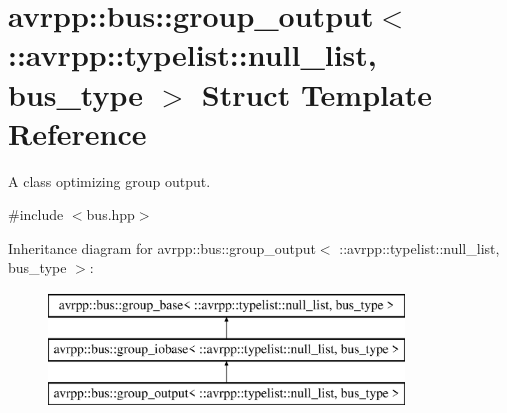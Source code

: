 \hypertarget{structavrpp_1_1bus_1_1group__output_3_01_1_1avrpp_1_1typelist_1_1null__list_00_01bus__type_01_4}{
\section{avrpp::bus::group\_\-output$<$ ::avrpp::typelist::null\_\-list, bus\_\-type $>$ Struct Template Reference}
\label{structavrpp_1_1bus_1_1group__output_3_01_1_1avrpp_1_1typelist_1_1null__list_00_01bus__type_01_4}
}


A class optimizing group output.  




{\ttfamily \#include $<$bus.hpp$>$}

Inheritance diagram for avrpp::bus::group\_\-output$<$ ::avrpp::typelist::null\_\-list, bus\_\-type $>$:\begin{figure}[H]
\begin{center}
\leavevmode
\includegraphics[height=3.000000cm]{structavrpp_1_1bus_1_1group__output_3_01_1_1avrpp_1_1typelist_1_1null__list_00_01bus__type_01_4}
\end{center}
\end{figure}
